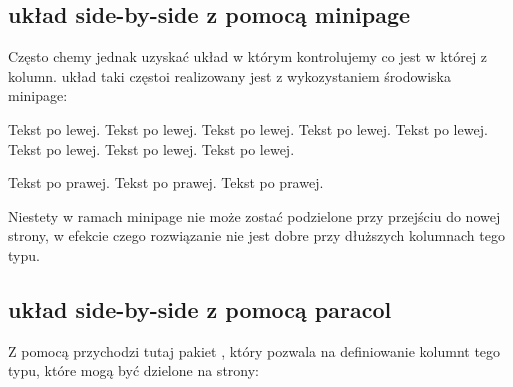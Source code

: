 \documentclass[fontSize=10pt,extra]{pdfArticle}
\begin{document}
\subsection{układ side-by-side z pomocą minipage}

Często chemy jednak uzyskać układ w którym kontrolujemy co jest w której z kolumn. układ taki częstoi realizowany jest z wykozystaniem środowiska minipage:

\begin{ExampleVertical*}
\hspace{2cm} %
\begin{minipage}{0.5\textwidth}
	Tekst po lewej. Tekst po lewej. Tekst po lewej. Tekst po lewej.
	Tekst po lewej. Tekst po lewej. Tekst po lewej. Tekst po lewej.
\end{minipage}
\hfill %
\begin{minipage}{0.3\textwidth}Tekst po prawej. Tekst po prawej. Tekst po prawej.\end{minipage}
\end{ExampleVertical*}

Niestety w ramach minipage nie może zostać podzielone przy przejściu do nowej strony,
w efekcie czego rozwiązanie nie jest dobre przy dłuższych kolumnach tego typu.

\subsection{układ side-by-side z pomocą paracol}

Z pomocą przychodzi tutaj pakiet , który pozwala na definiowanie kolumnt tego typu, które mogą być dzielone na strony:

\vspace{\parskip}
\end{document}
